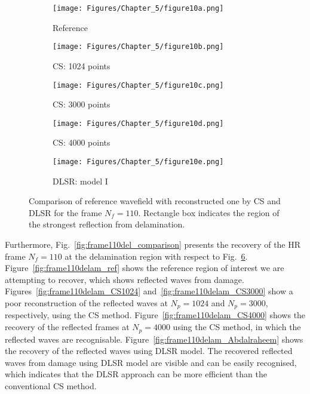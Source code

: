 \begin{figure} [h!]
	\centering
	\begin{subfigure}[b]{0.32\textwidth}
		\centering
		\texttt{[image: Figures/Chapter\_5/figure10a.png]}
		\caption{Reference}
		\label{fig:frame110_ref}
	\end{subfigure}
	\hfill
	\begin{subfigure}[b]{0.32\textwidth}
		\centering
		\texttt{[image: Figures/Chapter\_5/figure10b.png]}
		\caption{CS: 1024 points}
		\label{fig:frame110_CS1024}
	\end{subfigure}
	\hfill
	\begin{subfigure}[b]{0.32\textwidth}
		\centering
		\texttt{[image: Figures/Chapter\_5/figure10c.png]}
		\caption{CS: 3000 points}
		\label{fig:frame110_CS3000}
	\end{subfigure}	
	\hfill
	\begin{subfigure}[b]{0.32\textwidth}
		\centering
		\texttt{[image: Figures/Chapter\_5/figure10d.png]}
		\caption{CS: 4000 points}
		\label{fig:frame110_CS4000}
	\end{subfigure}
	\begin{subfigure}[b]{0.32\textwidth}
		\centering
		\texttt{[image: Figures/Chapter\_5/figure10e.png]}
		\caption{DLSR: model I}
		\label{fig:frame110_Abdalraheem}
	\end{subfigure}
	\caption{Comparison of reference wavefield with reconstructed one by CS and DLSR for the frame $N_f = 110$. Rectangle box indicates the region of the strongest reflection from delamination.}
	\label{fig:frame110_comparison}
\end{figure}

Furthermore, Fig.~\ref{fig:frame110del_comparison} presents the recovery of the HR frame $N_f=110$ at the delamination region with respect to Fig.~\ref{fig:frame110_comparison}.
Figure~\ref{fig:frame110delam_ref} shows the reference region of interest we are attempting to recover, which shows reflected waves from damage.
Figures~\ref{fig:frame110delam_CS1024} and~\ref{fig:frame110delam_CS3000} show a poor reconstruction of the reflected waves at $N_p=1024$ and $N_p=3000$, respectively, using the CS method.
Figure~\ref{fig:frame110delam_CS4000} shows the recovery of the reflected frames at $N_p=4000$ using the CS method, in which the reflected waves are recognisable.
Figure~\ref{fig:frame110delam_Abdalraheem} shows the recovery of the reflected waves using DLSR model.
The recovered reflected waves from damage using DLSR model are visible and can be easily recognised, which indicates that the DLSR approach can be more efficient than the conventional CS method. 

